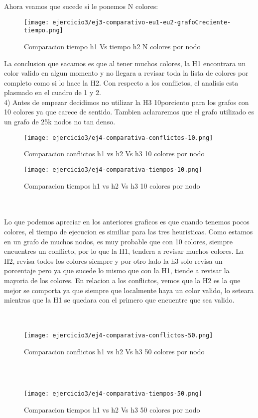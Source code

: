 \begin{enumerate}
Ahora veamos que sucede si le ponemos N colores:\\

\pagebreak
\begin{figure}[h!]
\texttt{[image: ejercicio3/ej3-comparativo-eu1-eu2-grafoCreciente-tiempo.png]}
\centering
\caption{Comparacion tiempo h1 Vs tiempo h2 N colores por nodo}
\label{overflow3}
\end{figure}

La conclusion que sacamos es que al tener muchos colores, la H1 encontrara un color valido en algun momento y no llegara a revisar toda la lista de colores por completo como si lo hace la H2. Con respecto a los conflictos, el analisis esta plasmado en el cuadro de 1 y 2.\\
4) Antes de empezar decidimos no utilizar la H3 10porciento para los grafos con 10 colores ya que carece de sentido. Tambien aclararemos que el grafo utilizado es un grafo de 25k nodos no tan denso.\\


\begin{figure}[h!]
\texttt{[image: ejercicio3/ej4-comparativa-conflictos-10.png]}
\centering
\caption{Comparacion conflictos h1 vs h2 Vs h3 10 colores por nodo}
\label{overflow3}
\end{figure}

\pagebreak

\begin{figure}[h!]
\texttt{[image: ejercicio3/ej4-comparativa-tiempos-10.png]}
\centering
\caption{Comparacion tiempos h1 vs h2 Vs h3 10 colores por nodo}
\label{overflow3}
\end{figure}
\\
\\
Lo que podemos apreciar en los anteriores graficos es que cuando tenemos pocos colores, el tiempo de ejecucion es similiar para las tres heuristicas. Como estamos en un grafo de muchos nodos, es muy probable que con 10 colores, siempre encuentres un conflicto, por lo que la H1, tendera a revisar muchos colores. La H2, revisa todos los colores siempre y por otro lado la h3 solo revisa un porcentaje pero ya que sucede lo mismo que con la H1, tiende a revisar la mayoria de los colores. En relacion a los conflictos, vemos que la H2 es la que mejor se comporta ya que siempre que localmente haya un color valido, lo seteara mientras que la H1 se quedara con el primero que encuentre que sea valido.\\
\\
\\
\begin{figure}[h!]
\texttt{[image: ejercicio3/ej4-comparativa-conflictos-50.png]}
\centering
\caption{Comparacion conflictos h1 vs h2 Vs h3 50 colores por nodo}
\label{overflow3}
\end{figure}
\\
\\
\begin{figure}[h!]
\texttt{[image: ejercicio3/ej4-comparativa-tiempos-50.png]}
\centering
\caption{Comparacion tiempos h1 vs h2 Vs h3 50 colores por nodo}
\label{overflow3}
\end{figure}


\end{enumerate}
